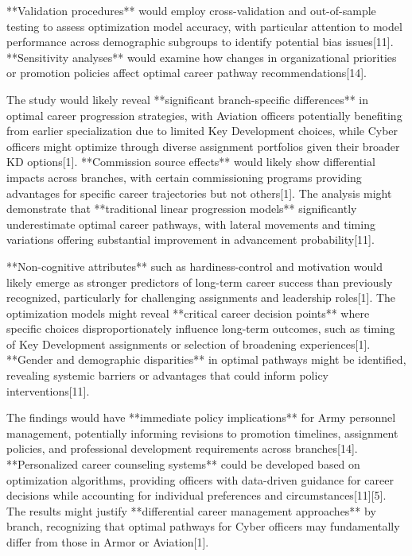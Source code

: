 \documentclass[main.tex]{subfiles}
\begin{document}
**Validation procedures** would employ cross-validation and out-of-sample testing to assess optimization model accuracy, with particular attention to model performance across demographic subgroups to identify potential bias issues[11]. **Sensitivity analyses** would examine how changes in organizational priorities or promotion policies affect optimal career pathway recommendations[14].


The study would likely reveal **significant branch-specific differences** in optimal career progression strategies, with Aviation officers potentially benefiting from earlier specialization due to limited Key Development choices, while Cyber officers might optimize through diverse assignment portfolios given their broader KD options[1]. **Commission source effects** would likely show differential impacts across branches, with certain commissioning programs providing advantages for specific career trajectories but not others[1]. The analysis might demonstrate that **traditional linear progression models** significantly underestimate optimal career pathways, with lateral movements and timing variations offering substantial improvement in advancement probability[11].

**Non-cognitive attributes** such as hardiness-control and motivation would likely emerge as stronger predictors of long-term career success than previously recognized, particularly for challenging assignments and leadership roles[1]. The optimization models might reveal **critical career decision points** where specific choices disproportionately influence long-term outcomes, such as timing of Key Development assignments or selection of broadening experiences[1]. **Gender and demographic disparities** in optimal pathways might be identified, revealing systemic barriers or advantages that could inform policy interventions[11].


The findings would have **immediate policy implications** for Army personnel management, potentially informing revisions to promotion timelines, assignment policies, and professional development requirements across branches[14]. **Personalized career counseling systems** could be developed based on optimization algorithms, providing officers with data-driven guidance for career decisions while accounting for individual preferences and circumstances[11][5]. The results might justify **differential career management approaches** by branch, recognizing that optimal pathways for Cyber officers may fundamentally differ from those in Armor or Aviation[1].
\end{document}
